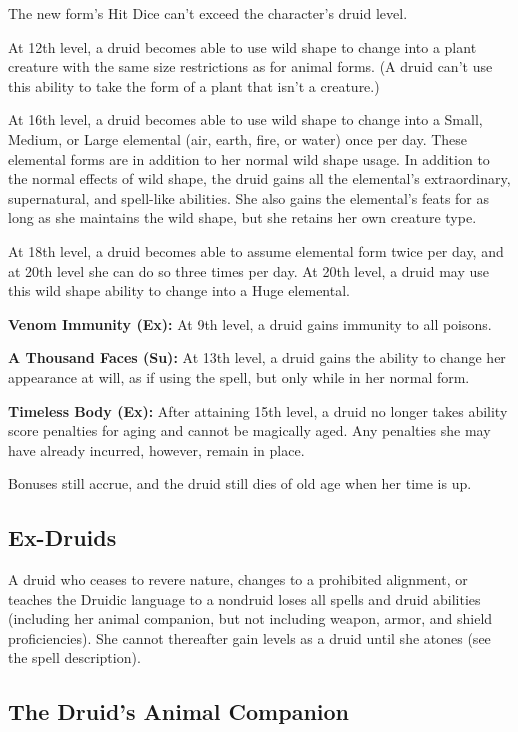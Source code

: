 The new form's Hit Dice can't exceed the character's druid level.

At 12th level, a druid becomes able to use wild shape to change into a plant creature with the same size restrictions as for animal forms. (A druid can't use this ability to take the form of a plant that isn't a creature.)

At 16th level, a druid becomes able to use wild shape to change into a Small, Medium, or Large elemental (air, earth, fire, or water) once per day. These elemental forms are in addition to her normal wild shape usage. In addition to the normal effects of wild shape, the druid gains all the elemental's extraordinary, supernatural, and spell-like abilities. She also gains the elemental's feats for as long as she maintains the wild shape, but she retains her own creature type.

At 18th level, a druid becomes able to assume elemental form twice per day, and at 20th level she can do so three times per day. At 20th level, a druid may use this wild shape ability to change into a Huge elemental.

\textbf{Venom Immunity (Ex):} At 9th level, a druid gains immunity to all poisons. 

\textbf{A Thousand Faces (Su):} At 13th level, a druid gains the ability to change her appearance at will, as if using the  spell, but only while in her normal form.

\textbf{Timeless Body (Ex):} After attaining 15th level, a druid no longer takes ability score penalties for aging and cannot be magically aged. Any penalties she may have already incurred, however, remain in place.

Bonuses still accrue, and the druid still dies of old age when her time is up.

\subsection{Ex-Druids}

A druid who ceases to revere nature, changes to a prohibited alignment, or teaches the Druidic language to a nondruid loses all spells and druid abilities (including her animal companion, but not including weapon, armor, and shield proficiencies). She cannot thereafter gain levels as a druid until she atones (see the  spell description).

\subsection{The Druid's Animal Companion}

